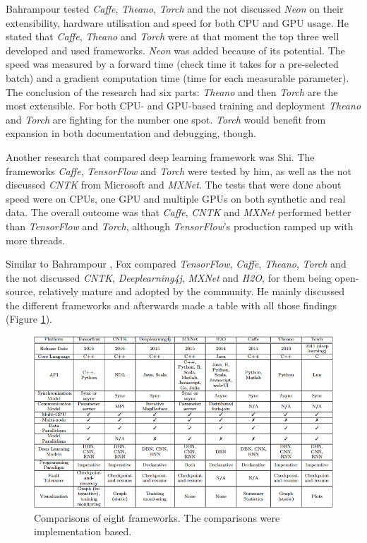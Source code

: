 \documentclass[10pt,a4paper]{report}
\begin{document}
	Bahrampour tested \textit{Caffe}, \textit{Theano},\textit{ Torch} and the not discussed \textit{Neon} on their 
	extensibility, hardware utilisation and speed for both CPU and GPU usage. 
	He stated that \textit{Caffe}, \textit{Theano} and \textit{Torch} were at that moment the top three 
	well developed and used frameworks. \textit{Neon} was added because of its 
	potential. The speed was measured by a forward time (check time it takes 
	for a pre-selected batch) and a gradient computation time (time for each 
	measurable parameter). The conclusion of the research had six parts: \textit{Theano} 
	and then \textit{Torch} are the most extensible. For both CPU- and GPU-based 
	training and deployment \textit{Theano} and \textit{Torch} are fighting for the number one 
	spot.\textit{ Torch} would benefit from expansion in both documentation and 
	debugging, though.  \cite{bahrampour2016comparative}
	
	Another research that compared deep learning framework was Shi. The 
	frameworks \textit{Caffe}, \textit{TensorFlow} and \textit{Torch} were tested by him, as well as the 
	not discussed \textit{CNTK} from Microsoft and \textit{MXNet}. The tests that were done about 
	speed were on CPUs, one GPU and multiple GPUs on both synthetic and real 
	data. The overall outcome was that \textit{Caffe}, \textit{CNTK} and \textit{MXNet} performed better 
	than \textit{TensorFlow} and \textit{Torch}, although \textit{TensorFlow}'s production ramped up with 
	more threads.
	 \cite{DBLP:journals/corr/ShiWXC16}
	
	
	Similar to Bahrampour \cite{bahrampour2016comparative}, Fox compared 
	\textit{TensorFlow}, \textit{Caffe},\textit{ Theano}, \textit{Torch} and the not discussed \textit{CNTK}, 
	\textit{Deeplearning4j}, \textit{MXNet} and\textit{ H2O}, for them being open-source, relatively 
	mature and adopted by the community. He mainly discussed the different 
	frameworks and afterwards made a table with all those findings (Figure 
	\ref{fig:FramewComps}).  \cite{fox2016software}
	
	\begin{figure}[h!]
		\includegraphics[scale=0.8]{FrameworkComparisons.PNG}
		\caption{Comparisons of eight frameworks. The comparisons were 
			implementation based.}
		\label{fig:FramewComps}
	\end{figure}
	
\end{document}
